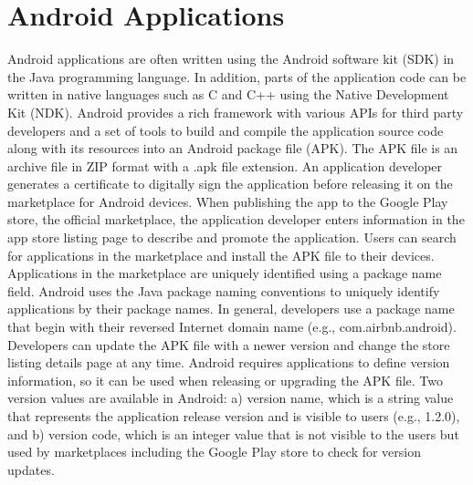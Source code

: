 \section{Android Applications}
Android applications are often written using the Android software kit (SDK) in the Java programming language.
In addition, parts of the application code can be written in native languages such as C and C++ using the Native Development Kit (NDK).
Android provides a rich framework with various APIs for third party developers and a set of tools to build and compile the application source code along with its resources into an Android package file (APK).
The APK file is an archive file in ZIP format with a .apk file extension.
An application developer generates a certificate to digitally sign the application before releasing it on the marketplace for Android devices.
When publishing the app to the Google Play store, the official marketplace, the application developer enters information in the app store listing page to describe and promote the application.
Users can search for applications in the marketplace and install the APK file to their devices.
Applications in the marketplace are uniquely identified using a package name field.
Android uses the Java package naming conventions to uniquely identify applications by their package names.
In general, developers use a package name that begin with their reversed Internet domain name (e.g., com.airbnb.android).
Developers can update the APK file with a newer version and change the store listing details page at any time.
Android requires applications to define version information, so it can be used when releasing or upgrading the APK file.
Two version values are available in Android: a) version name, which is a string value that represents the application release version and is visible to users (e.g., 1.2.0), and b) version code, which is an integer value that is not visible to the users but used by marketplaces including the Google Play store to check for version updates.

